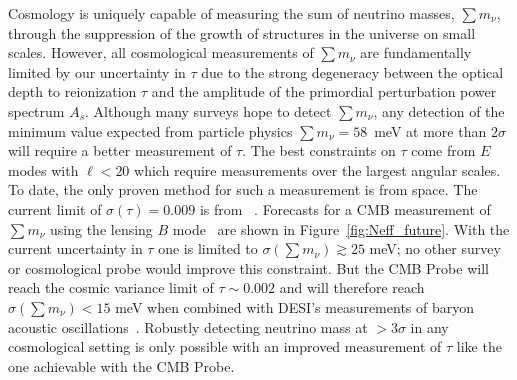 Cosmology is uniquely capable of measuring the sum of neutrino masses, $\sum m_\nu$, through the 
suppression of the growth of structures in the universe on small scales.   However, all cosmological 
measurements of $\sum m_\nu$ are fundamentally limited by our uncertainty in $\tau$ due to the strong degeneracy 
between the optical depth to reionization $\tau$ and the amplitude of the primordial perturbation power spectrum
$A_s$.  Although many surveys hope to detect $\sum m_\nu$, any detection 
of the minimum value expected from particle physics $\sum m_\nu = 58$~meV at more than $2 \sigma$ will 
require a better measurement of $\tau$.  The best constraints on $\tau$ come from $E$ modes with $\ell < 20$ which require 
measurements over the largest angular scales. To date, the only proven method for such a measurement is from space. 
The current limit of $\sigma({\tau}) = 0.009$ is from \planck~\cite{planck2016_xlvi}.  Forecasts for a
CMB measurement of $\sum m_\nu$ using the lensing $B$ mode~\cite{Kaplinghat:2003bh} are shown in 
Figure~\ref{fig:Neff_future}.  With the current uncertainty in $\tau$ one is limited to  
$\sigma(\sum m_\nu) \gtrsim 25$ meV; no other survey or cosmological probe would improve this constraint.  
But the \ac{CMB} Probe will reach the cosmic variance limit of $\tau \sim 0.002$ and will therefore 
reach $\sigma(\sum m_\nu) < 15$ meV when combined with DESI's measurements of 
baryon acoustic oscillations~\cite{Levi:2013gra}.  Robustly detecting neutrino mass at  $> 3\sigma$ in any cosmological setting is 
only possible with an improved measurement of $\tau$ like the one achievable with the \ac{CMB} Probe.



